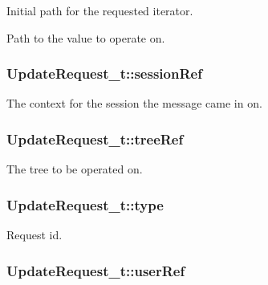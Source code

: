 Initial path for the requested iterator. 

Path to the value to operate on. 
\subsubsection[{\texorpdfstring{session\+Ref}{sessionRef}}]{ Update\+Request\+\_\+t\+::session\+Ref}\hypertarget{struct_update_request__t_a8490e97a015cb059c423b27b415ce254}{}\label{struct_update_request__t_a8490e97a015cb059c423b27b415ce254}
The context for the session the message came in on. 
\subsubsection[{\texorpdfstring{tree\+Ref}{treeRef}}]{ Update\+Request\+\_\+t\+::tree\+Ref}\hypertarget{struct_update_request__t_a90e1fbd86a484bb56b39bd844d0064d7}{}\label{struct_update_request__t_a90e1fbd86a484bb56b39bd844d0064d7}


The tree to be operated on. 

\subsubsection[{\texorpdfstring{type}{type}}]{ Update\+Request\+\_\+t\+::type}\hypertarget{struct_update_request__t_a86b8158651e576979e082d212f18f272}{}\label{struct_update_request__t_a86b8158651e576979e082d212f18f272}


Request id. 

\subsubsection[{\texorpdfstring{user\+Ref}{userRef}}]{ Update\+Request\+\_\+t\+::user\+Ref}\hypertarget{struct_update_request__t_a236f18342e080cd70c17bee21a3023dc}{}\label{struct_update_request__t_a236f18342e080cd70c17bee21a3023dc}


